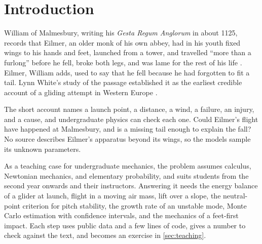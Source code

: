 \section{Introduction}

William of Malmesbury, writing his \textit{Gesta Regum Anglorum} in about 1125, records
that Eilmer, an older monk of his own abbey, had in his youth fixed wings to his hands and
feet, launched from a tower, and travelled ``more than a furlong'' before he fell, broke both
legs, and was lame for the rest of his life \autocite{williamMalmesbury_gesta}.
Eilmer, William adds, used to say that he fell because he had forgotten to fit a tail.
Lynn White's study of the passage established it as the earliest credible account of a
gliding attempt in Western Europe \autocite{white1961eilmer}.

The short account names a launch point, a distance, a wind, a failure, an injury, and a
cause, and undergraduate physics can check each one.
Could Eilmer's flight have happened at Malmesbury, and is a missing tail enough to explain
the fall?
No source describes Eilmer's apparatus beyond its wings, so the models sample its unknown
parameters.

As a teaching case for undergraduate mechanics, the problem assumes calculus, Newtonian
mechanics, and elementary probability, and suits students from the second year onwards and
their instructors.
Answering it needs the energy balance of a glider at launch, flight in a moving air mass,
lift over a slope, the neutral-point criterion for pitch stability, the growth rate of an
unstable mode, Monte Carlo estimation with confidence intervals, and the mechanics of a
feet-first impact.
Each step uses public data and a few lines of code, gives a number to check against the
text, and becomes an exercise in \cref{sec:teaching}.
